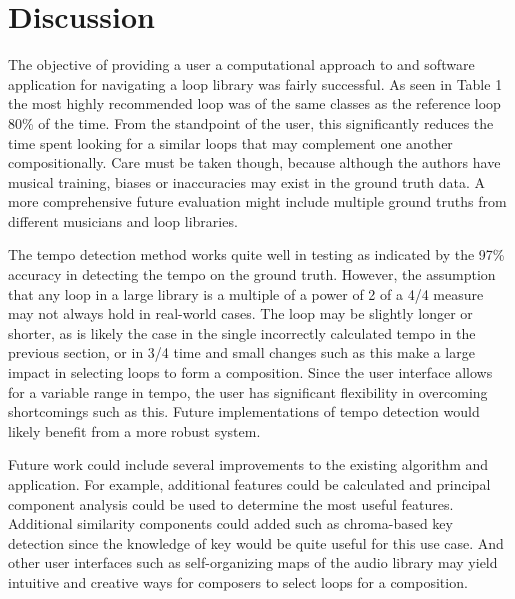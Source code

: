 \documentclass{article}
\begin{document}
\section{Discussion}

The objective of providing a user a computational approach to and software application for navigating a loop library was fairly successful. As seen in Table 1 the most highly recommended loop was of the same classes as the reference loop 80\% of the time. From the standpoint of the user, this significantly reduces the time spent looking for a similar loops that may complement one another compositionally. Care must be taken though, because although the authors have musical training, biases or inaccuracies may exist in the ground truth data. A more comprehensive future evaluation might include multiple ground truths from different musicians and loop libraries.

The tempo detection method works quite well in testing as indicated by the 97\% accuracy in detecting the tempo on the ground truth. However, the assumption that any loop in a large library is a multiple of a power of 2 of a 4/4 measure may not always hold in real-world cases. The loop may be slightly longer or shorter, as is likely the case in the single incorrectly calculated tempo in the previous section, or in 3/4 time and small changes such as this make a large impact in selecting loops to form a composition. Since the user interface allows for a variable range in tempo, the user has significant flexibility in overcoming shortcomings such as this. Future implementations of tempo detection would likely benefit from a more robust system.

Future work could include several improvements to the existing algorithm and application. For example, additional features could be calculated and principal component analysis could be used to determine the most useful features. Additional similarity components could added such as chroma-based key detection since the knowledge of key would be quite useful for this use case. And other user interfaces such as self-organizing maps of the audio library may yield intuitive and creative ways for composers to select loops for a composition.



\end{document}
